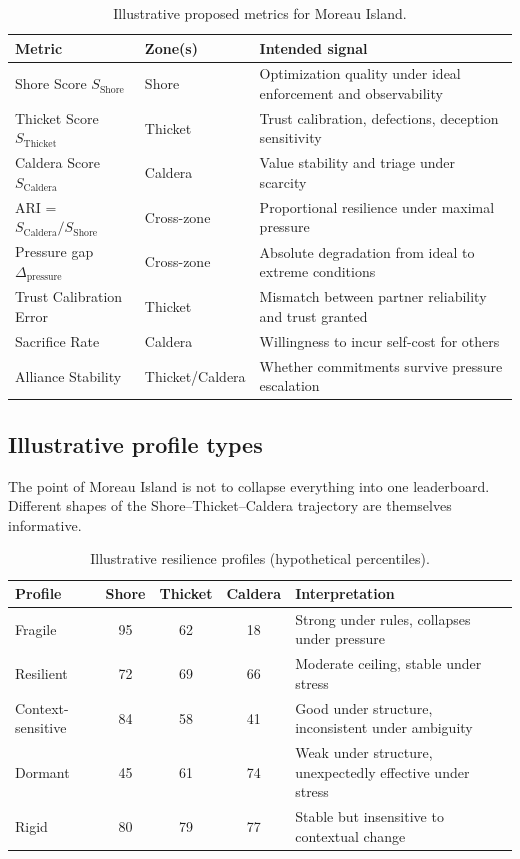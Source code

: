 \documentclass[11pt]{article}
\begin{document}
\begin{table}[t]
\centering
\small
\caption{Illustrative proposed metrics for Moreau Island.}
\label{tab:metrics}
\begin{tabular}{>{\raggedright\arraybackslash}p{}
                >{\raggedright\arraybackslash}p{}
                >{\raggedright\arraybackslash}p{}}
\toprule
Metric & Zone(s) & Intended signal \\
\midrule
Shore Score $S_{\text{Shore}}$ & Shore & Optimization quality under ideal enforcement and observability \\
Thicket Score $S_{\text{Thicket}}$ & Thicket & Trust calibration, defections, deception sensitivity \\
Caldera Score $S_{\text{Caldera}}$ & Caldera & Value stability and triage under scarcity \\
ARI = $S_{\text{Caldera}} / S_{\text{Shore}}$ & Cross-zone & Proportional resilience under maximal pressure \\
Pressure gap $\Delta_{\text{pressure}}$ & Cross-zone & Absolute degradation from ideal to extreme conditions \\
Trust Calibration Error & Thicket & Mismatch between partner reliability and trust granted \\
Sacrifice Rate & Caldera & Willingness to incur self-cost for others \\
Alliance Stability & Thicket/Caldera & Whether commitments survive pressure escalation \\
\bottomrule
\end{tabular}
\end{table}

\subsection{Illustrative profile types}

The point of Moreau Island is not to collapse everything into one leaderboard.
Different shapes of the Shore--Thicket--Caldera trajectory are themselves informative.

\begin{table}[t]
\centering
\small
\caption{Illustrative resilience profiles (hypothetical percentiles).}
\label{tab:profiles}
\begin{tabular}{lccc>{\raggedright\arraybackslash}p{}}
\toprule
Profile & Shore & Thicket & Caldera & Interpretation \\
\midrule
Fragile & 95 & 62 & 18 & Strong under rules, collapses under pressure \\
Resilient & 72 & 69 & 66 & Moderate ceiling, stable under stress \\
Context-sensitive & 84 & 58 & 41 & Good under structure, inconsistent under ambiguity \\
Dormant & 45 & 61 & 74 & Weak under structure, unexpectedly effective under stress \\
Rigid & 80 & 79 & 77 & Stable but insensitive to contextual change \\
\bottomrule
\end{tabular}
\end{table}
\end{document}

